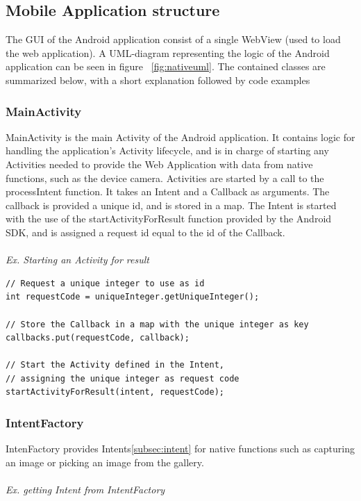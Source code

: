 \subsection{Mobile Application structure} \label{subsec:mobile-application-structure-native}
The GUI of the Android application consist of a single WebView (used to load the web application). A UML-diagram representing the logic of the Android application can be seen in figure ~\ref{fig:nativeuml}. The contained classes are summarized below, with a short explanation followed by code examples 


\subsubsection{MainActivity} 
MainActivity is the main Activity of the Android application. It contains logic for handling the application's Activity lifecycle, and is in charge of starting any Activities needed to provide the Web Application with data from native functions, such as the device camera. Activities are started by a call to the processIntent function. It takes an Intent and a Callback as arguments. The callback is provided a unique id, and is stored in a map. The Intent is started with the use of the startActivityForResult function provided by the Android SDK, and is assigned a request id equal to the id of the Callback. 
\\\\
	
\emph{Ex. Starting an Activity for result}
\begin{lstlisting}
// Request a unique integer to use as id
int requestCode = uniqueInteger.getUniqueInteger();

// Store the Callback in a map with the unique integer as key	
callbacks.put(requestCode, callback);
   
// Start the Activity defined in the Intent, 
// assigning the unique integer as request code
startActivityForResult(intent, requestCode);
\end{lstlisting}
	
\subsubsection{IntentFactory} 
IntenFactory provides Intents\ref{subsec:intent} for native functions such as capturing an image or picking an image from the gallery.
	\\\\
	\emph{Ex. getting Intent from IntentFactory}
	
